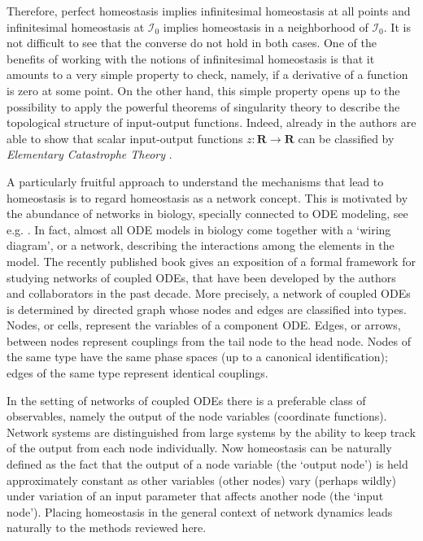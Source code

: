 \documentclass[pdflatex,sn-basic,Numbered]{sn-jnl}
\newcommand{\II}{{\mathcal I}}
\newcommand{\R}{{\mathbf R}}
\theoremstyle{thmstyleone}%
\numberwithin{equation}{section}
\begin{document}
Therefore, perfect homeostasis implies infinitesimal homeostasis at all points and infinitesimal homeostasis at $\II_0$ implies homeostasis in a neighborhood of $\II_0$.
It is not difficult to see that the converse do not hold in both cases.
One of the benefits of working with the notions of infinitesimal homeostasis is that it amounts to a very simple property to check, namely, if a derivative of a function is zero at some point.
On the other hand, this simple property opens up to the possibility to apply the powerful theorems of singularity theory to describe the topological structure of input-output functions.
Indeed, already in \cite{GS17} the authors are able to show that scalar input-output functions $z:\R\to\R$ can be classified by \emph{Elementary Catastrophe Theory} \cite{thom1969,thom1975,zeeman1977}.

A particularly fruitful approach to understand the mechanisms that lead to homeostasis is to regard homeostasis as a network concept.
This is motivated by the abundance of networks in biology, specially connected to ODE modeling, see e.g. \cite{NBR14,RBGSN17,F16}.
In fact, almost all ODE models in biology come together with a `wiring diagram', or a network, describing the interactions
among the elements in the model.
The recently published book \cite{gs2023} gives an exposition of a formal framework for studying networks of coupled ODEs, that have been developed by the authors and collaborators in the past decade. 
More precisely, a network of coupled ODEs is determined by directed graph whose nodes and edges are classified into types. 
Nodes, or cells, represent the variables of a component ODE. 
Edges, or arrows, between nodes represent couplings
from the tail node to the head node. 
Nodes of the same type have the same phase spaces (up to a canonical identification); edges of the same type represent identical couplings.

In the setting of networks of coupled ODEs there is a preferable class of observables, namely the output of the node variables (coordinate functions).
Network systems are distinguished from large systems by the ability to keep track of the output from each node individually. 
Now homeostasis can be naturally defined as the fact that the output of a node variable (the `output node') is held approximately constant as other variables (other nodes) vary (perhaps wildly) under variation of an input parameter that affects another node (the `input node').
Placing homeostasis in the general context of network dynamics leads naturally to the methods reviewed here.
\end{document}
